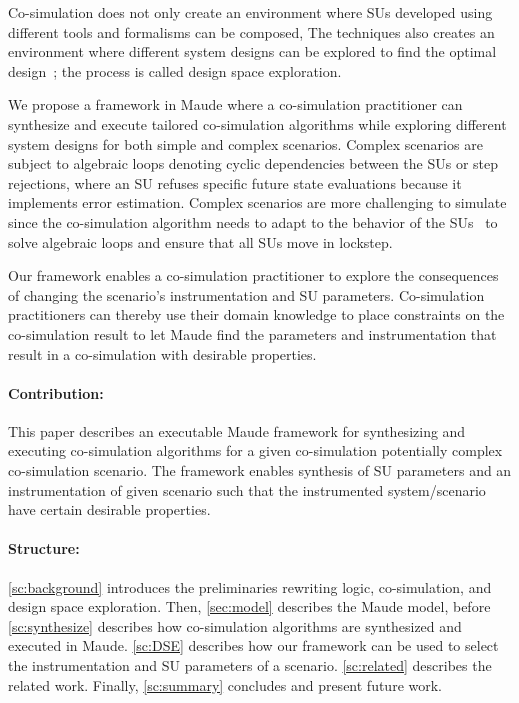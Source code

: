 Co-simulation does not only create an environment where SUs developed using different tools and formalisms can be composed,
The techniques also creates an environment where different system designs can be explored to find the optimal design~\cite{dse,gamble_design_2014}; the process is called design space exploration.

We propose a framework in Maude where a co-simulation practitioner can synthesize and execute tailored co-simulation algorithms while exploring different system designs for both simple and complex scenarios.
Complex scenarios are subject to algebraic loops denoting cyclic dependencies between the SUs or step rejections, where an SU refuses specific future state evaluations because it implements error estimation.
Complex scenarios are more challenging to simulate since the co-simulation algorithm needs to adapt to the behavior of the SUs~\cite{thrane2021} to solve algebraic loops and ensure that all SUs move in lockstep.

Our framework enables a co-simulation practitioner to explore the consequences of changing the scenario's instrumentation and SU parameters. 
Co-simulation practitioners can thereby use their domain knowledge to place constraints on the co-simulation result to let Maude find the parameters and instrumentation that result in a co-simulation with desirable properties. 

\paragraph{Contribution:}
This paper describes an executable Maude framework for synthesizing and executing co-simulation algorithms for a given co-simulation potentially complex co-simulation scenario.
The framework enables synthesis of SU parameters and an instrumentation of given scenario such that the instrumented system/scenario have certain desirable properties.

\paragraph{Structure:}
\cref{sc:background} introduces the preliminaries rewriting logic, co-simulation, and design space exploration.
Then, \cref{sec:model} describes the Maude model, before \cref{sc:synthesize} describes how co-simulation algorithms are synthesized and executed in Maude.
\cref{sc:DSE} describes how our framework can be used to select the instrumentation and SU parameters of a scenario.
\cref{sc:related} describes the related work. 
Finally, \cref{sc:summary} concludes and present future work.